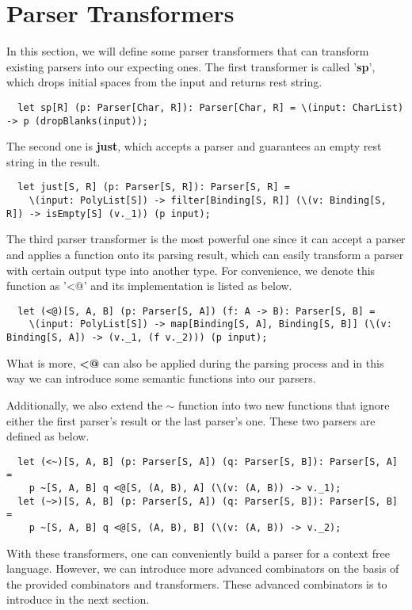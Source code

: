 \section{Parser Transformers}
In this section, we will define some parser transformers that can transform existing parsers into our expecting ones. The first transformer is called '\textbf{sp}', which drops initial spaces from the input and returns rest string.
\begin{lstlisting}
  let sp[R] (p: Parser[Char, R]): Parser[Char, R] = \(input: CharList) -> p (dropBlanks(input));
\end{lstlisting}
The second one is \textbf{just}, which accepts a parser and guarantees an empty rest string in the result.
\begin{lstlisting}
  let just[S, R] (p: Parser[S, R]): Parser[S, R] =
	\(input: PolyList[S]) -> filter[Binding[S, R]] (\(v: Binding[S, R]) -> isEmpty[S] (v._1)) (p input);
\end{lstlisting}
The third parser transformer is the most powerful one since it can accept a parser and applies a function onto its parsing result, which can easily transform a parser with certain output type into another type. For convenience, we denote this function as '<@' and its implementation is listed as below.
\begin{lstlisting}
  let (<@)[S, A, B] (p: Parser[S, A]) (f: A -> B): Parser[S, B] =
	\(input: PolyList[S]) -> map[Binding[S, A], Binding[S, B]] (\(v: Binding[S, A]) -> (v._1, (f v._2))) (p input);
\end{lstlisting}
What is more, \textbf{<@} can also be applied during the parsing process and in this way we can introduce some semantic functions into our parsers.

Additionally, we also extend the \textbf{$\sim$} function into two new functions that ignore either the first parser's result or the last parser's one. These two parsers are defined as below.
\begin{lstlisting}
  let (<~)[S, A, B] (p: Parser[S, A]) (q: Parser[S, B]): Parser[S, A] =
	p ~[S, A, B] q <@[S, (A, B), A] (\(v: (A, B)) -> v._1);
  let (~>)[S, A, B] (p: Parser[S, A]) (q: Parser[S, B]): Parser[S, B] =
	p ~[S, A, B] q <@[S, (A, B), B] (\(v: (A, B)) -> v._2);
\end{lstlisting}
With these transformers, one can conveniently build a parser for a context free language. However, we can introduce more advanced combinators on the basis of the provided combinators and transformers. These advanced combinators is to introduce in the next section.

